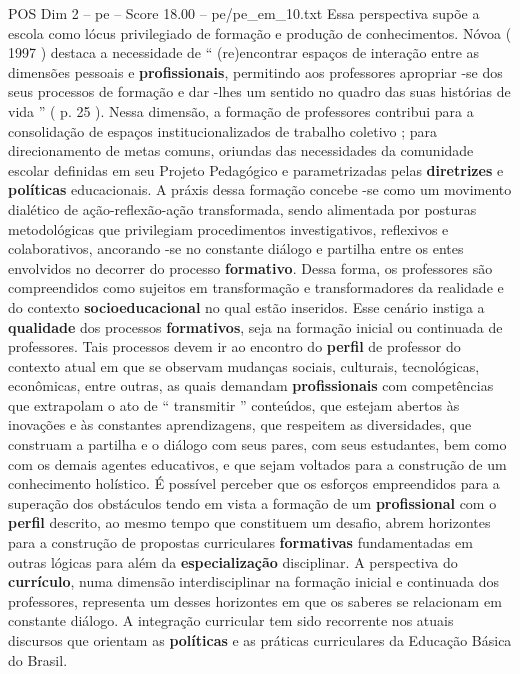 \begin{textsample}{POS Dim 2 – pe – Score 18.00 – pe/pe\_em\_10.txt}
Essa perspectiva supõe a escola como lócus privilegiado de formação e produção de conhecimentos.
Nóvoa ( 1997 ) destaca a necessidade de “ (re)encontrar espaços de interação entre as dimensões pessoais e \textbf{profissionais}, permitindo aos professores apropriar -se dos seus processos de formação e dar -lhes um sentido no quadro das suas histórias de vida ” ( p. 25 ).
Nessa dimensão, a formação de professores contribui para a consolidação de espaços institucionalizados de trabalho coletivo ; para direcionamento de metas comuns, oriundas das necessidades da comunidade escolar definidas em seu Projeto Pedagógico e parametrizadas pelas \textbf{diretrizes} e \textbf{políticas} educacionais.
A práxis dessa formação concebe -se como um movimento dialético de ação-reflexão-ação transformada, sendo alimentada por posturas metodológicas que privilegiam procedimentos investigativos, reflexivos e colaborativos, ancorando -se no constante diálogo e partilha entre os entes envolvidos no decorrer do processo \textbf{formativo}.
Dessa forma, os professores são compreendidos como sujeitos em transformação e transformadores da realidade e do contexto \textbf{socioeducacional} no qual estão inseridos.
Esse cenário instiga a \textbf{qualidade} dos processos \textbf{formativos}, seja na formação inicial ou continuada de professores.
Tais processos devem ir ao encontro do \textbf{perfil} de professor do contexto atual em que se observam mudanças sociais, culturais, tecnológicas, econômicas, entre outras, as quais demandam \textbf{profissionais} com competências que extrapolam o ato de “ transmitir ” conteúdos, que estejam abertos às inovações e às constantes aprendizagens, que respeitem as diversidades, que construam a partilha e o diálogo com seus pares, com seus estudantes, bem como com os demais agentes educativos, e que sejam voltados para a construção de um conhecimento holístico.
É possível perceber que os esforços empreendidos para a superação dos obstáculos tendo em vista a formação de um \textbf{profissional} com o \textbf{perfil} descrito, ao mesmo tempo que constituem um desafio, abrem horizontes para a construção de propostas curriculares \textbf{formativas} fundamentadas em outras lógicas para além da \textbf{especialização} disciplinar.
A perspectiva do \textbf{currículo}, numa dimensão interdisciplinar na formação inicial e continuada dos professores, representa um desses horizontes em que os saberes se relacionam em constante diálogo.
A integração curricular tem sido recorrente nos atuais discursos que orientam as \textbf{políticas} e as práticas curriculares da Educação Básica do Brasil.

\end{textsample}
